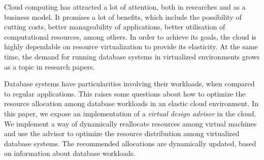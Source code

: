 Cloud computing has attracted a lot of attention, both in researches and as a business model. It promises a lot of benefits, which include the possibility of cutting costs, better manageability of applications, better utilisation of computational resources, among others. In order to achieve its goals, the cloud is highly dependable on resource virtualization to provide its elasticity. At the same time, the demand for running database systems in virtualized environments grows as a topic in research papers. %

Database systems have particularities involving their workloads, when compared to regular applications. This raises some questions about how to optimize the resource allocation among database workloads in an elastic cloud environment. In this paper, we expose an implementation of a \textit{virtual design advisor} in the cloud. We implement a way of dynamically reallocate resources among virtual machines and use the advisor to optimize the resource distribution among virtualized database systems. The recommended allocations are dynamically updated, based on information about database workloads. %